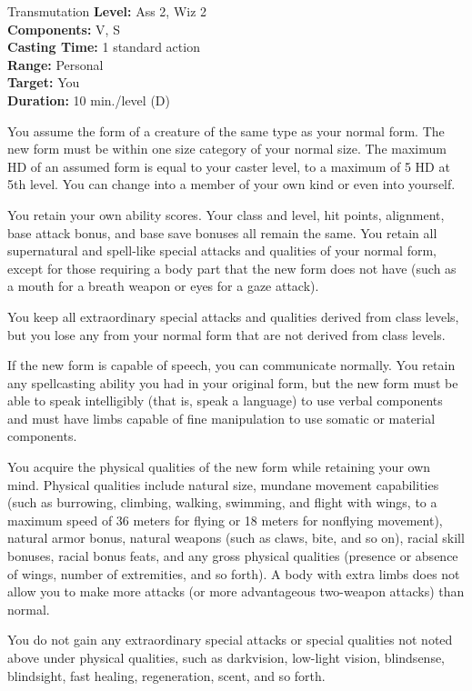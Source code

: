 {Transmutation}
{
	\textbf{Level:}
	Ass 2, Wiz 2\\
	\textbf{Components:}
	V, S\\
	\textbf{Casting Time:}
	1 standard action\\
	\textbf{Range:}
	Personal\\
	\textbf{Target:}
	You\\
	\textbf{Duration:}
	10 min./level (D)\\
}
{
	You assume the form of a creature of the same type as your normal form. The new form must be within one size category of your normal size. The maximum HD of an assumed form is equal to your caster level, to a maximum of 5 HD at 5th level. You can change into a member of your own kind or even into yourself.

	You retain your own ability scores. Your class and level, hit points, alignment, base attack bonus, and base save bonuses all remain the same. You retain all supernatural and spell-like special attacks and qualities of your normal form, except for those requiring a body part that the new form does not have (such as a mouth for a breath weapon or eyes for a gaze attack).

	You keep all extraordinary special attacks and qualities derived from class levels, but you lose any from your normal form that are not derived from class levels.

	If the new form is capable of speech, you can communicate normally. You retain any spellcasting ability you had in your original form, but the new form must be able to speak intelligibly (that is, speak a language) to use verbal components and must have limbs capable of fine manipulation to use somatic or material components.

	You acquire the physical qualities of the new form while retaining your own mind. Physical qualities include natural size, mundane movement capabilities (such as burrowing, climbing, walking, swimming, and flight with wings, to a maximum speed of 36 meters for flying or 18 meters for nonflying movement), natural armor bonus, natural weapons (such as claws, bite, and so on), racial skill bonuses, racial bonus feats, and any gross physical qualities (presence or absence of wings, number of extremities, and so forth). A body with extra limbs does not allow you to make more attacks (or more advantageous two-weapon attacks) than normal.

	You do not gain any extraordinary special attacks or special qualities not noted above under physical qualities, such as darkvision, low-light vision, blindsense, blindsight, fast healing, regeneration, scent, and so forth.

}

